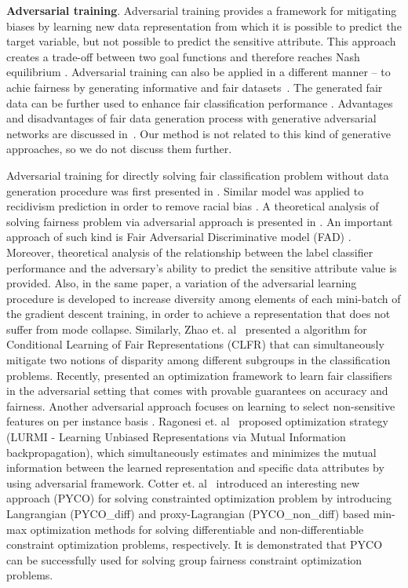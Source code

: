 \documentclass[preprint,12pt]{elsarticle}
\begin{document}
\textbf{Adversarial training}. Adversarial training provides a framework for mitigating biases by learning new data representation from which it is possible to predict the target variable, but not possible to predict the sensitive attribute. This approach creates a trade-off between two goal functions and therefore reaches Nash equilibrium \cite{goodfellow2014generative}. Adversarial training can also be applied in a different manner -- to achie fairness by generating informative and fair datasets~\cite{rajabi2021tabfairgan, choi2020fair}. The generated fair data can be further used to enhance fair classification performance \cite{jang2021constructing}. Advantages and disadvantages of fair data generation process with generative adversarial networks are discussed in~\cite{kenfack2021fairness}. Our method is not related to this kind of generative approaches, so we do not discuss them further.

Adversarial training for directly solving fair classification problem without data generation procedure was first presented in \cite{zhang2018mitigating}. Similar model was applied to recidivism prediction in order to remove racial bias \cite{wadsworth2018achieving, teo2021measuring}.
A theoretical analysis of solving fairness problem via adversarial approach is presented in \cite{madras2018learning}. 
An important approach of such kind is Fair Adversarial Discriminative model (FAD) \cite{adel2019one}. Moreover, theoretical analysis of the relationship between the label classifier performance and the adversary’s ability to predict the sensitive attribute value is provided. Also, in the same paper, a variation of the adversarial learning procedure is developed to increase diversity among elements of each mini-batch of the gradient descent training, in order to achieve a representation that does not suffer from mode collapse. Similarly, Zhao et. al~\cite{zhao2019conditional} presented a algorithm for Conditional Learning of Fair Representations (CLFR) that can simultaneously mitigate two notions of disparity among different subgroups in the classification problems. Recently, \cite{celis2021fair} presented an optimization framework to learn fair classifiers in the adversarial setting that comes with provable guarantees on accuracy and fairness.
Another adversarial approach focuses on learning to select non-sensitive features on per instance basis \cite{wang2019approaching}. 
Ragonesi et. al~\cite{ragonesi2021learning} proposed optimization strategy (LURMI - Learning Unbiased Representations via Mutual Information backpropagation), which simultaneously estimates and minimizes the mutual information between the learned representation and specific data attributes by using adversarial framework.
Cotter et. al~\cite{cotter2019optimization} introduced an interesting new approach (PYCO) for solving constrainted optimization problem by introducing Langrangian (PYCO\_diff) and proxy-Lagrangian (PYCO\_non\_diff) based min-max optimization methods for solving differentiable and non-differentiable constraint optimization problems, respectively. It is demonstrated that PYCO can be successfully used for solving group fairness constraint optimization problems. 
\end{document}
